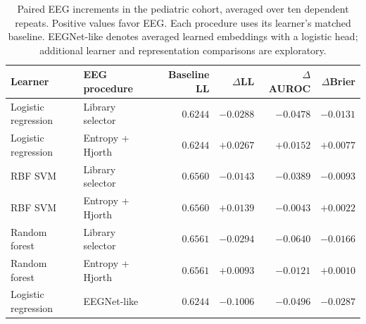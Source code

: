 \begin{table}[t]
\centering
\caption{Paired EEG increments in the pediatric cohort, averaged over ten dependent repeats. Positive values favor EEG. Each procedure uses its learner's matched baseline. EEGNet-like denotes averaged learned embeddings with a logistic head; additional learner and representation comparisons are exploratory.}
\label{tab:learner}
\begin{tabular}{llrrrr}
\toprule
Learner & EEG procedure & Baseline LL & $\Delta$LL & $\Delta$AUROC & $\Delta$Brier\\
\midrule
Logistic regression & Library selector & $0.6244$ & $-0.0288$ & $-0.0478$ & $-0.0131$\\
Logistic regression & Entropy + Hjorth & $0.6244$ & $+0.0267$ & $+0.0152$ & $+0.0077$\\
RBF SVM & Library selector & $0.6560$ & $-0.0143$ & $-0.0389$ & $-0.0093$\\
RBF SVM & Entropy + Hjorth & $0.6560$ & $+0.0139$ & $-0.0043$ & $+0.0022$\\
Random forest & Library selector & $0.6561$ & $-0.0294$ & $-0.0640$ & $-0.0166$\\
Random forest & Entropy + Hjorth & $0.6561$ & $+0.0093$ & $-0.0121$ & $+0.0010$\\
Logistic regression & EEGNet-like & $0.6244$ & $-0.1006$ & $-0.0496$ & $-0.0287$\\
\bottomrule\end{tabular}
\end{table}
